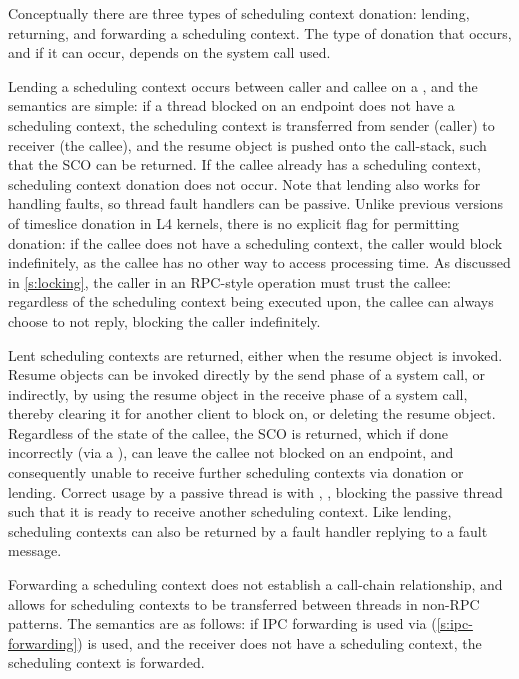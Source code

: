 Conceptually there are three types of scheduling context donation: lending, returning, and
forwarding a scheduling context. The type of donation that occurs, and if it can occur, depends on
the system call used. 

Lending a scheduling context occurs between caller and callee on a \call, and
the semantics are simple: if a thread 
blocked on an endpoint does not have a scheduling context, the scheduling context is transferred
from sender (caller) to receiver (the callee), and the resume object is pushed
onto the call-stack, such that the \gls{SCO} can be returned. If the callee already has a scheduling
context, scheduling context donation does not occur. Note that lending also works for
handling faults, so thread fault handlers can be passive. Unlike previous versions of timeslice
donation in L4 kernels, there is no explicit flag for permitting donation: if the callee does not
have a scheduling context, the caller would block indefinitely, as the callee has no other way to
access processing time. As discussed in \cref{s:locking},
the caller in an RPC-style operation must trust the callee: regardless of the scheduling context
being executed upon, the callee can always choose to not reply, blocking the caller indefinitely. 

Lent scheduling contexts are returned, either when the resume object is invoked. Resume objects 
can be invoked directly by the send phase of a system call, or indirectly, by using the
resume object in the receive phase of a system call, thereby clearing it for another client to block
on, or deleting the resume object.
Regardless of the state of the callee, the \gls{SCO} is returned, which if done
incorrectly (via a \send), can leave the callee not blocked on an endpoint, and consequently 
unable to receive further scheduling contexts via donation or lending. Correct usage by a passive thread is with \replyrecv,
\nbsendrecv, blocking the passive thread such that it is ready to receive another scheduling
context. Like lending, scheduling contexts can also be returned by a fault handler replying to a fault message.

Forwarding a scheduling context does not establish a call-chain relationship, and allows
for scheduling contexts to be transferred between threads in non-RPC patterns. The semantics are
as follows: if \gls{IPC} forwarding is used via \nbsendrecv (\cref{s:ipc-forwarding}) is used, and the receiver does not have a scheduling context,
the scheduling context is forwarded. 

